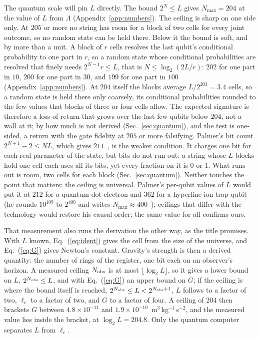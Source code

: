\documentclass[aps,prd,twocolumn,superscriptaddress,nofootinbib,showkeys]{revtex4-2}
\newcommand{\lc}{\ell_c}
\begin{document}
The quantum scale will pin $L$ directly. The bound $2^N\le L$ gives $N_{\max}=204$ at the value of $L$ from $\Lambda$ (Appendix~\ref{app:numbers}). The ceiling is sharp on one side only. At $205$ or more no string has room for a block of two cells for every joint outcome, so no random state can be held there. Below it the bound is soft, and by more than a unit. A block of $r$ cells resolves the last qubit's conditional probability to one part in $r$, so a random state whose conditional probabilities are resolved that finely needs $2^{N-1}r\le L$, that is $N\le\log_2(2L/r)$: $202$ for one part in $10$, $200$ for one part in $30$, and $199$ for one part in $100$ (Appendix~\ref{app:numbers}). At $204$ itself the blocks average $L/2^{203} = 3.4$ cells, so a random state is held there only coarsely, its conditional probabilities rounded to the few values that blocks of three or four cells allow. The expected signature is therefore a loss of return that grows over the last few qubits below $204$, not a wall at it; by how much is not derived (Sec.~\ref{sec:quantum}), and the test is one-sided, a return with the gate fidelity at $205$ or more falsifying. Palmer's bit count $2^{N+1}-2\le NL$, which gives $211$~\cite{palmer2026c}, is the weaker condition. It charges one bit for each real parameter of the state, but bits do not run out: a string whose $L$ blocks hold one cell each uses all its bits, yet every fraction on it is 0 or 1. What runs out is room, two cells for each block (Sec.~\ref{sec:quantum}). Neither touches the point that matters: the ceiling is universal. Palmer's per-qubit values of $L$ would put it at $212$ for a quantum-dot electron and $362$ for a hyperfine ion-trap qubit (he rounds $10^{109}$ to $2^{400}$ and writes $N_{\max}\approx400$~\cite{palmer2026}); ceilings that differ with the technology would restore his causal order; the same value for all confirms ours.

That measurement also runs the derivation the other way, as the title promises. With $L$ known, Eq.~(\ref{eq:ident}) gives the cell from the size of the universe, and Eq.~(\ref{eq:G}) gives Newton's constant. Gravity's strength is then a derived quantity: the number of rings of the register, one bit each on an observer's horizon. A measured ceiling $N_{\rm obs}$ is at most $\lfloor\log_2 L\rfloor$, so it gives a lower bound on $L$, $2^{N_{\rm obs}}\le L$, and with Eq.~(\ref{eq:G}) an upper bound on $G$; if the ceiling is where the bound itself is reached, $2^{N_{\rm obs}}\le L<2^{N_{\rm obs}+1}$, $L$ follows to a factor of two, $\lc$ to a factor of two, and $G$ to a factor of four. A ceiling of $204$ then brackets $G$ between $4.8\times10^{-11}$ and $1.9\times10^{-10}$~m$^3$\,kg$^{-1}$\,s$^{-2}$, and the measured value lies inside the bracket, at $\log_2 L = 204.8$. Only the quantum computer separates $L$ from $\lc$.
\end{document}
